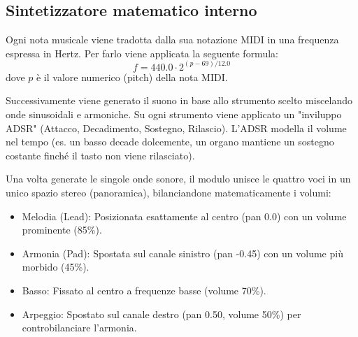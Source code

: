 \subsection{Sintetizzatore matematico interno}
Ogni nota musicale viene tradotta dalla sua notazione MIDI in una frequenza espressa in Hertz.
Per farlo viene applicata la seguente formula:
\[f = 440.0 \cdot 2^{(p-69)/12.0}\]
dove $p$ è il valore numerico (pitch) della nota MIDI.

Successivamente viene generato il suono in base allo strumento scelto miscelando onde sinusoidali e armoniche. Su ogni strumento viene applicato un "inviluppo ADSR" (Attacco, Decadimento, Sostegno, Rilascio). 
L'ADSR modella il volume nel tempo (es. un basso decade dolcemente, un organo mantiene un sostegno costante finché il tasto non viene rilasciato).



Una volta generate le singole onde sonore, il modulo unisce le quattro voci in un unico spazio stereo (panoramica), bilanciandone matematicamente i volumi:
\begin{itemize}
    \item Melodia (Lead): Posizionata esattamente al centro (pan 0.0)
 con un volume prominente (85\%).
    \item  Armonia (Pad): Spostata sul canale sinistro (pan -0.45) con un volume più morbido (45\%).
    \item Basso: Fissato al centro a frequenze basse (volume 70\%).

    \item  Arpeggio: Spostato sul canale destro (pan 0.50, volume 50\%) per controbilanciare l'armonia.
\end{itemize}
